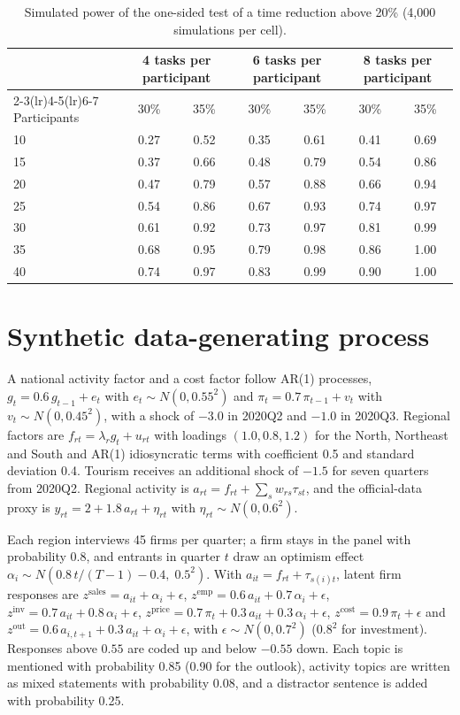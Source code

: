 \documentclass[11pt]{article}
\begin{document}
\begin{table}[h]
\centering\small
\caption{Simulated power of the one-sided test of a time reduction above 20\% (4{,}000 simulations per cell).}\label{tab:powergrid}
\begin{tabular}{@{}lcccccc@{}}
\toprule
 & \multicolumn{2}{c}{4 tasks per participant} & \multicolumn{2}{c}{6 tasks per participant} & \multicolumn{2}{c}{8 tasks per participant} \\
\cmidrule(lr){2-3}\cmidrule(lr){4-5}\cmidrule(lr){6-7}
Participants & 30\% & 35\% & 30\% & 35\% & 30\% & 35\% \\
\midrule
10 & 0.27 & 0.52 & 0.35 & 0.61 & 0.41 & 0.69 \\
15 & 0.37 & 0.66 & 0.48 & 0.79 & 0.54 & 0.86 \\
20 & 0.47 & 0.79 & 0.57 & 0.88 & 0.66 & 0.94 \\
25 & 0.54 & 0.86 & 0.67 & 0.93 & 0.74 & 0.97 \\
30 & 0.61 & 0.92 & 0.73 & 0.97 & 0.81 & 0.99 \\
35 & 0.68 & 0.95 & 0.79 & 0.98 & 0.86 & 1.00 \\
40 & 0.74 & 0.97 & 0.83 & 0.99 & 0.90 & 1.00 \\
\bottomrule
\end{tabular}
\end{table}

\section{Synthetic data-generating process}\label{app:dgp}
A national activity factor and a cost factor follow AR(1) processes, $g_t = 0.6\,g_{t-1} + e_t$ with $e_t \sim N(0, 0.55^2)$ and $\pi_t = 0.7\,\pi_{t-1} + v_t$ with $v_t \sim N(0, 0.45^2)$, with a shock of $-3.0$ in 2020Q2 and $-1.0$ in 2020Q3. Regional factors are $f_{rt} = \lambda_r g_t + u_{rt}$ with loadings $(1.0, 0.8, 1.2)$ for the North, Northeast and South and AR(1) idiosyncratic terms with coefficient 0.5 and standard deviation 0.4. Tourism receives an additional shock of $-1.5$ for seven quarters from 2020Q2. Regional activity is $a_{rt} = f_{rt} + \sum_s w_{rs}\tau_{st}$, and the official-data proxy is $y_{rt} = 2 + 1.8\,a_{rt} + \eta_{rt}$ with $\eta_{rt} \sim N(0, 0.6^2)$.

Each region interviews 45 firms per quarter; a firm stays in the panel with probability 0.8, and entrants in quarter $t$ draw an optimism effect $\alpha_i \sim N(0.8\,t/(T-1) - 0.4,\; 0.5^2)$. With $a_{it} = f_{rt} + \tau_{s(i)t}$, latent firm responses are $z^{\mathrm{sales}} = a_{it} + \alpha_i + \epsilon$, $z^{\mathrm{emp}} = 0.6\,a_{it} + 0.7\,\alpha_i + \epsilon$, $z^{\mathrm{inv}} = 0.7\,a_{it} + 0.8\,\alpha_i + \epsilon$, $z^{\mathrm{price}} = 0.7\,\pi_t + 0.3\,a_{it} + 0.3\,\alpha_i + \epsilon$, $z^{\mathrm{cost}} = 0.9\,\pi_t + \epsilon$ and $z^{\mathrm{out}} = 0.6\,a_{i,t+1} + 0.3\,a_{it} + \alpha_i + \epsilon$, with $\epsilon \sim N(0, 0.7^2)$ ($0.8^2$ for investment). Responses above $0.55$ are coded up and below $-0.55$ down. Each topic is mentioned with probability 0.85 (0.90 for the outlook), activity topics are written as mixed statements with probability 0.08, and a distractor sentence is added with probability 0.25.
\end{document}
